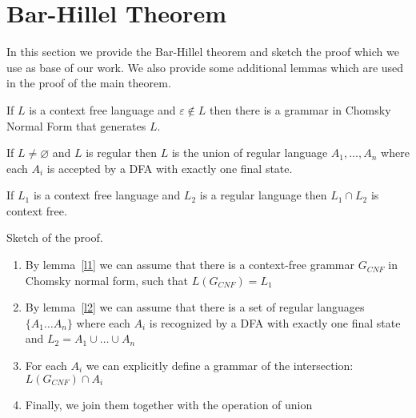 \section{Bar-Hillel Theorem}
\label{sec:b-h-th}

In this section we provide the Bar-Hillel theorem and sketch the proof which we use as base of our work.
We also provide some additional lemmas which are used in the proof of the main theorem.

\begin{lemma} \label{l1}
	If $L$ is a context free language and $\varepsilon \notin L$ then there is a grammar in Chomsky Normal Form that generates $L$.
\end{lemma}

\begin{lemma} \label{l2}
	If $ L \neq \varnothing $ and $L$ is regular then $L$ is the union of regular language $A_1, \ldots , A_n$ where each $A_i$ is accepted by a DFA with exactly one final state.
\end{lemma}

\begin{theorem}
	If $L_1$ is a context free language and $L_2$ is a regular language then $L_1 \cap L_2$ is context free.
\end{theorem}


Sketch of the proof.
\begin{enumerate}
	\item By lemma~\ref{l1} we can assume that there is a context-free grammar $G_{CNF}$ in Chomsky normal form, such that $L(G_{CNF}) = L_1$
	\item By lemma~\ref{l2} we can assume that there is a set of regular languages $\{A_{1} \ldots A_n \}$ where each $A_i$ is recognized by a DFA with exactly one final state and $L_2 = A_1 \cup \ldots \cup A_n$
	\item For each $A_i$ we can explicitly define a grammar of the intersection: $L( G_{CNF} ) \cap A_i$
	\item Finally, we join them together with the operation of union
\end{enumerate}
